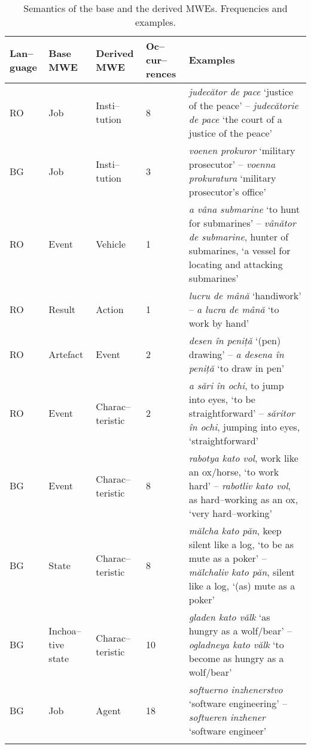 \documentclass[output=paper]{langsci/langscibook}
\begin{document}
\begin{table}[H]
\begin{tabular}{p{0.9cm}p{1cm}p{1.2cm}p{0.7cm}p{6.2cm}}
\lsptoprule
\textbf{Lan–guage} &
\textbf{Base MWE} &
\textbf{Derived MWE} &
\textbf{Oc–cur–rences} &
\textbf{Examples}\\
\midrule
RO &
 Job &
 Insti–tution &
 8 &
\textit{judecător de pace} ‘justice of the peace’ –
\textit{judecătorie de pace} ‘the court of a justice of the peace’\\
BG &
 Job &
 Insti–tution &
 3 &
\textit{voenen prokuror} ‘military
prosecutor’ – \textit{voenna prokuratura} ‘military prosecutor's
office’\\
 RO &
 Event &
 Vehicle &
 1 &
\textit{a vâna submarine} ‘to hunt for
submarines’ – \textit{vânător de submarine}, hunter of
submarines, `a vessel for locating and attacking submarines'\\
 RO &
 Result &
 Action &
 1 &
\textit{lucru de mână} ‘handiwork’ – \textit{a
lucra de mână} ‘to work by hand’\\
 RO &
 Artefact &
 Event &
 2 &
 \textit{desen în peniță} ‘(pen) drawing’ –
\textit{a desena în peniță} ‘to draw in pen’\\
 RO &
 Event &
 Charac–teristic &
 2 &
\textit{a sări în ochi}, to jump into eyes,
‘to be straightforward’ – \textit{săritor în ochi}, jumping into eyes,
‘straightforward’\\

 BG &
 Event &
 Charac–teristic &
 8 &
\textit{rabotya kato vol}, work like an
ox/horse, `to work hard' –  \textit{rabotliv kato vol}, as hard–working as an ox, ‘very
hard–working’\\
 BG &
 State &
 Charac–teristic &
 8 &
\textit{mălcha kato păn}, keep silent like a log, ‘to be as
mute as a poker’ – \textit{mălchaliv kato păn}, silent like a log, ‘(as)
mute as a poker’\\
 BG &
 Inchoa–tive state &
 Charac–teristic &
 10 &
\textit{gladen kato vălk} ‘as hungry as a
wolf/bear’ – \textit{ogladneya kato vălk} ‘to become as hungry as a
wolf/bear’\\
 BG &
 Job &
 Agent &
 18 &
 \textit{softuerno inzhenerstvo} ‘software
engineering’ – \textit{softueren inzhener} ‘software engineer’\\
\lspbottomrule
\end{tabular}
\caption{Semantics of the base and the derived MWEs. Frequencies and examples.}
\label{tab:8:6}
\end{table}
\end{document}
